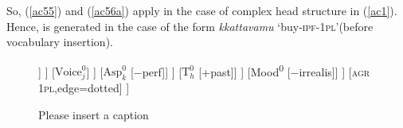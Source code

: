 \documentclass[output=paper]{langscibook}
\begin{document}
So, (\ref{ac55}) and (\ref{ac56a}) apply in the case of complex head structure in (\ref{ac1}).  Hence,  is generated in the case of the form \textit{kkattavamu} ‘buy-\textsc{ipf}-\textsc{1pl}’(before vocabulary insertion).

\begin{figure}
\caption{\label{ac57}\color{red}Please insert a caption}
	\begin{forest}
		[Mood\textsuperscript{P}
			[Mood$^0$
				[$\text{T}^0_h$
					[$\text{Asp}^0_k$
						[$\text{Voice}^0_j$
							[v\textsuperscript{0}
								[$\surd{}\text{Root}^0_i$ \textsc{buy}]
								[v\textsuperscript{0}
									[v\textsuperscript{0}]
									[TV]
								]
							]
							[$\text{Voice}^0_j$]
						]
						[$\text{Asp}^0_k$ {[−perf]}]
					]
					[$\text{T}^0_h$ {[+past]}]
				]
				[Mood\textsuperscript{0} {[−irrealis]}]
			]
			[\textsc{agr 1pl},edge=dotted]
		]
	\end{forest}
\end{figure}
\end{document}
